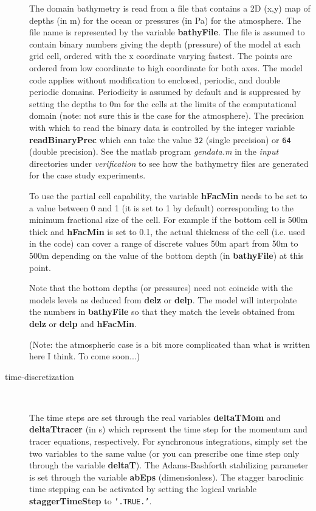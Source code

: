 \begin{description}
  The domain bathymetry is read from a file that contains a 2D (x,y)
  map of depths (in m) for the ocean or pressures (in Pa) for the
  atmosphere. The file name is represented by the variable
  \textbf{bathyFile}. The file is assumed to contain binary numbers
  giving the depth (pressure) of the model at each grid cell, ordered
  with the x coordinate varying fastest. The points are ordered from
  low coordinate to high coordinate for both axes. The model code
  applies without modification to enclosed, periodic, and double
  periodic domains. Periodicity is assumed by default and is
  suppressed by setting the depths to 0m for the cells at the limits
  of the computational domain (note: not sure this is the case for the
  atmosphere). The precision with which to read the binary data is
  controlled by the integer variable \textbf{readBinaryPrec} which can
  take the value \texttt{32} (single precision) or \texttt{64} (double
  precision). See the matlab program \textit{gendata.m} in the
  \textit{input} directories under \textit{verification} to see how
  the bathymetry files are generated for the case study experiments.
  
  To use the partial cell capability, the variable \textbf{hFacMin}
  needs to be set to a value between 0 and 1 (it is set to 1 by
  default) corresponding to the minimum fractional size of the cell.
  For example if the bottom cell is 500m thick and \textbf{hFacMin} is
  set to 0.1, the actual thickness of the cell (i.e. used in the code)
  can cover a range of discrete values 50m apart from 50m to 500m
  depending on the value of the bottom depth (in \textbf{bathyFile})
  at this point.
  
  Note that the bottom depths (or pressures) need not coincide with
  the models levels as deduced from \textbf{delz} or \textbf{delp}.
  The model will interpolate the numbers in \textbf{bathyFile} so that
  they match the levels obtained from \textbf{delz} or \textbf{delp}
  and \textbf{hFacMin}.
  
  (Note: the atmospheric case is a bit more complicated than what is
  written here I think. To come soon...)

\item[time-discretization] \ 
  
  The time steps are set through the real variables \textbf{deltaTMom}
  and \textbf{deltaTtracer} (in s) which represent the time step for
  the momentum and tracer equations, respectively. For synchronous
  integrations, simply set the two variables to the same value (or you
  can prescribe one time step only through the variable
  \textbf{deltaT}). The Adams-Bashforth stabilizing parameter is set
  through the variable \textbf{abEps} (dimensionless). The stagger
  baroclinic time stepping can be activated by setting the logical
  variable \textbf{staggerTimeStep} to \texttt{'.TRUE.'}.

\end{description}


